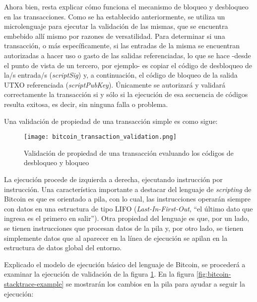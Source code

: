 Ahora bien, resta explicar cómo funciona el mecanismo de bloqueo y desbloqueo en las transacciones. Como se ha establecido anteriormente, se utiliza un microlenguaje para ejecutar la validación de las mismas, que se encuentra embebido allí mismo por razones de versatilidad. Para determinar si una transacción, o más específicamente, si las entradas de la misma se encuentran autorizadas a hacer uso o gasto de las salidas referenciadas, lo que se hace -desde el punto de vista de un tercero, por ejemplo- es copiar el código de desbloqueo de la/s entrada/s (\textit{scriptSig}) y, a continuación, el código de bloqueo de la salida UTXO referenciada (\textit{scriptPubKey}). Únicamente se autorizará y validará correctamente la transacción si y sólo si la ejecución de esa secuencia de códigos resulta exitosa, es decir, sin ninguna falla o problema.

Una validación de propiedad de una transacción simple es como sigue:

\begin{figure}[H]
  \texttt{[image: bitcoin\_transaction\_validation.png]}
  \centering
  \caption{Validación de propiedad de una transacción evaluando los códigos de desbloqueo y bloqueo}
  \label{fig:bitcoin-transaction-validation}
\end{figure}

La ejecución procede de izquierda a derecha, ejecutando instrucción por instrucción. Una característica importante a destacar del lenguaje de \textit{scripting} de Bitcoin es que es orientado a pila, con lo cual, las instrucciones operarán siempre con datos en una estructura de tipo LIFO (\textit{Last-In-First-Out}, ``el último dato que ingresa es el primero en salir''). Otra propiedad del lenguaje es que, por un lado, se tienen instrucciones que procesan datos de la pila y, por otro lado, se tienen simplemente datos que al aparecer en la línea de ejecución se apilan en la estructura de datos global del entorno.

Explicado el modelo de ejecución básico del lenguaje de Bitcoin, se procederá a examinar la ejecución de validación de la figura \ref{fig:bitcoin-transaction-validation}. En la figura \ref{fig:bitcoin-stacktrace-example} se mostrarán los cambios en la pila para ayudar a seguir la ejecución:

